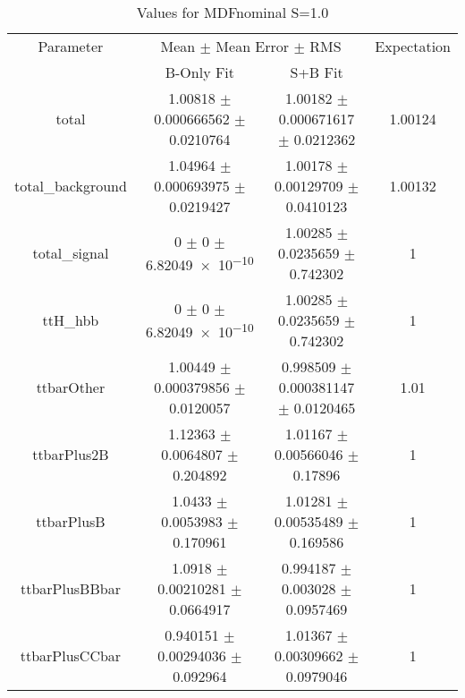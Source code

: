 \begin{table}
\centering
\caption{Values for MDFnominal S=1.0}
\begin{tabular}{cccc}
\toprule
Parameter & \multicolumn{2}{c}{Mean $\pm$ Mean Error $\pm$ RMS} & Expectation\\
 & B-Only Fit & S+B Fit & \\
\midrule
total & \num{1.00818} $\pm$ \num{0.000666562} $\pm$ \num{0.0210764} & \num{1.00182} $\pm$ \num{0.000671617} $\pm$ \num{0.0212362} & \num{1.00124}\\
total\_background & \num{1.04964} $\pm$ \num{0.000693975} $\pm$ \num{0.0219427} & \num{1.00178} $\pm$ \num{0.00129709} $\pm$ \num{0.0410123} & \num{1.00132}\\
total\_signal & \num{0} $\pm$ \num{0} $\pm$ \num{6.82049e-10} & \num{1.00285} $\pm$ \num{0.0235659} $\pm$ \num{0.742302} & \num{1}\\
ttH\_hbb & \num{0} $\pm$ \num{0} $\pm$ \num{6.82049e-10} & \num{1.00285} $\pm$ \num{0.0235659} $\pm$ \num{0.742302} & \num{1}\\
ttbarOther & \num{1.00449} $\pm$ \num{0.000379856} $\pm$ \num{0.0120057} & \num{0.998509} $\pm$ \num{0.000381147} $\pm$ \num{0.0120465} & \num{1.01}\\
ttbarPlus2B & \num{1.12363} $\pm$ \num{0.0064807} $\pm$ \num{0.204892} & \num{1.01167} $\pm$ \num{0.00566046} $\pm$ \num{0.17896} & \num{1}\\
ttbarPlusB & \num{1.0433} $\pm$ \num{0.0053983} $\pm$ \num{0.170961} & \num{1.01281} $\pm$ \num{0.00535489} $\pm$ \num{0.169586} & \num{1}\\
ttbarPlusBBbar & \num{1.0918} $\pm$ \num{0.00210281} $\pm$ \num{0.0664917} & \num{0.994187} $\pm$ \num{0.003028} $\pm$ \num{0.0957469} & \num{1}\\
ttbarPlusCCbar & \num{0.940151} $\pm$ \num{0.00294036} $\pm$ \num{0.092964} & \num{1.01367} $\pm$ \num{0.00309662} $\pm$ \num{0.0979046} & \num{1}\\
\bottomrule
\end{tabular}
\end{table}